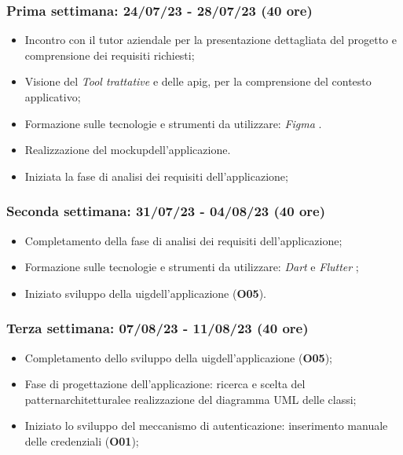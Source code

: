 \subsubsection{Prima settimana: 24/07/23 - 28/07/23 (40 ore)}
    \begin{itemize}
        \item Incontro con il tutor aziendale per la presentazione dettagliata del progetto e comprensione dei requisiti richiesti;
        \item Visione del \emph{Tool trattative} e delle \gls{apig}\glsoccur, per la comprensione del contesto applicativo;
        \item Formazione sulle tecnologie e strumenti da utilizzare: \emph{Figma} \cite{site:figma}.
        \item Realizzazione del \gls{mockup}\glsoccur dell'applicazione.
        \item Iniziata la fase di analisi dei requisiti dell'applicazione;
    \end{itemize}
\subsubsection{Seconda settimana: 31/07/23 - 04/08/23 (40 ore)}
    \begin{itemize}
        \item Completamento della fase di analisi dei requisiti dell'applicazione;
        \item Formazione sulle tecnologie e strumenti da utilizzare: \emph{Dart} \cite{site:dart} e \emph{Flutter} \cite{site:flutter};
        \item Iniziato sviluppo  della \gls{uig}\glsoccur dell'applicazione (\textbf{O05}).
    \end{itemize}
\subsubsection{Terza settimana: 07/08/23 - 11/08/23 (40 ore)}
    \begin{itemize}
        \item Completamento dello sviluppo della \gls{uig}\glsoccur dell'applicazione (\textbf{O05});
        \item Fase di progettazione dell'applicazione: ricerca e scelta del \gls{patternarchitetturale}\glsoccur e realizzazione del diagramma UML delle classi;
        \item Iniziato lo sviluppo del meccanismo di autenticazione: inserimento manuale delle credenziali (\textbf{O01});
    \end{itemize}

